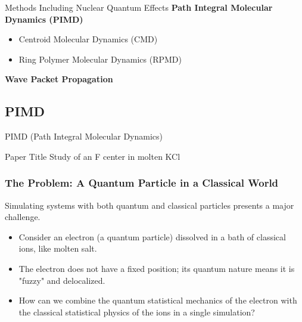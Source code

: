 \begin{frame}{Methods Including Nuclear Quantum Effects}
    \textbf{Path Integral Molecular Dynamics (PIMD)}
    \begin{itemize}
        \item Centroid Molecular Dynamics (CMD)
        \item Ring Polymer Molecular Dynamics (RPMD)
    \end{itemize}
    \vspace{1em}

    \textbf{Wave Packet Propagation}
\end{frame}

\subsection{PIMD}


\begin{frame}{PIMD (Path Integral Molecular Dynamics)}
	\begin{block}{Paper Title}
	Study of an F center in molten KCl
	\end{block}
\end{frame}

\begin{frame}
  \frametitle{The Problem: A Quantum Particle in a Classical World}
  
  Simulating systems with both quantum and classical particles presents a major challenge. \pause
  
  \begin{itemize}
    \item Consider an electron (a quantum particle) dissolved in a bath of classical ions, like molten salt. \pause
    
    \item The electron does not have a fixed position; its quantum nature means it is "fuzzy" and delocalized. \pause
    
    \item How can we combine the quantum statistical mechanics of the electron with the classical statistical physics of the ions in a single simulation?
  \end{itemize}
\end{frame}

